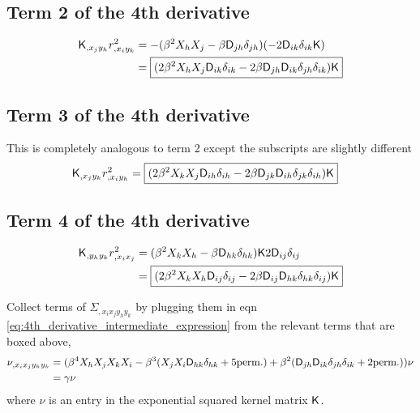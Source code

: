 \subsection{Term 2 of the 4th derivative}
\begin{align*}
\mathsf{K}_{,x_j y_h} r^2_{,x_i y_k}
&= - (\beta^2 X_h X_j - \beta \mathsf{D}_{jh} \delta_{jh}) (-2\mathsf{D}_{ik}
\delta_{ik} \mathsf{K}) \\  
&= \boxed{( 2 \beta^2  X_h X_j \mathsf{D}_{ik} \delta_{ik} 
-2 \beta \mathsf{D}_{jh} \mathsf{D}_{ik} \delta_{jh} \delta_{ik}) \mathsf{K}} 
\end{align*}

\subsection{Term 3 of the 4th derivative}
This is completely analogous to term 2 except the subscripts are slightly
different
\begin{align*}
\mathsf{K}_{,x_j y_k} r^2_{,x_i y_h}
&=\boxed { ( 2 \beta^2  X_k X_j \mathsf{D}_{ih} \delta_{ih} 
-2 \beta \mathsf{D}_{jk} \mathsf{D}_{ih} \delta_{jk} \delta_{ih}) \mathsf{K}} 
\end{align*}

\subsection{Term 4 of the 4th derivative} 
\begin{align*}
\mathsf{K}_{,y_h y_k} r^2_{,x_i x_j}
&= (\beta^2 X_k X_h - \beta \mathsf{D}_{hk}\delta_{hk})\mathsf{K} 2 \mathsf{D}_{ij} \delta_{ij}\\ 
&= \boxed{(2\beta^2 X_k X_h \mathsf{D}_{ij} \delta_{ij} - 2\beta \mathsf{D}_{ij} \mathsf{D}_{hk} \delta_{hk}
\delta_{ij})\mathsf{K} } 
\end{align*}

Collect terms of $\Sigma_{,x_i x_j y_h y_k}$ by plugging them in eqn
\ref{eq:4th_derivative_intermediate_expression}
from the relevant terms that are boxed above, 
\begin{align}
\nu_{,x_i x_j y_h y_k} &= (\beta^4 X_h X_j X_k X_i -  
\beta^3 (X_j X_i \mathsf{D}_{hk} \delta_{hk} + 5 {\rm perm.}) + \beta^2
(\mathsf{D}_{jh} \mathsf{D}_{ik}\delta_{jh}\delta_{ik} + 2 {\rm perm.})) \nu \\
&= \gamma \nu
\end{align}
where $\nu$ is an entry in the exponential squared kernel matrix $\mathsf{K}$.
